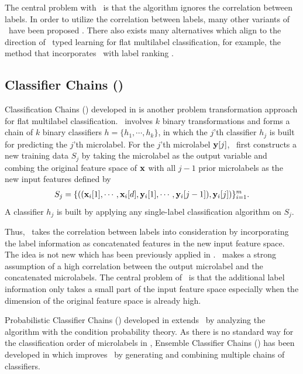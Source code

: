 {The central problem with \mlknn\ is that the algorithm ignores the correlation between labels.
In order to utilize the correlation between labels, many other variants of \mlknn\ have been proposed \citep{Cheng09combining,Younes11a}.
There also exists many alternatives which align to the direction of \knn\ typed learning for flat multilabel classification, for example, the method that incorporates \knn\ with label ranking \citep{Brinker07case,Chiang12a}.



%
%
\subsection{Classifier Chains (\cc)}

Classification Chains (\cc) developed in \citep{Read09classifier,Read11classifier} is another problem transformation approach for flat multilabel classification.
\cc\ involves $k$ binary transformations and forms a chain of $k$ binary classifiers $h=\{h_1,\cdots,h_k\}$, in which the $j$'th classifier $h_j$ is built for predicting the $j$'th microlabel.
For the $j$'th microlabel $\mathbf {y}[j]$, \cc\ first constructs a new training data $S_j$ by taking the microlabel as the output variable and combing the original feature space of $\mathbf {x}$ with all $j-1$ prior microlabels as the new input features defined by
\begin{align*}
	S_j = \{((\mathbf {x}_i[1],\cdots,\mathbf {x}_i[d],\mathbf {y}_i[1],\cdots,\mathbf {y}_i[j-1]),\mathbf {y}_i[j])\}_{i=1}^{m}.
\end{align*}
A classifier $h_j$ is built by applying any single-label classification algorithm on $S_j$.

Thus, \cc\ takes the correlation between labels into consideration by incorporating the label information as concatenated features in the new input feature space.
The idea is not new which has been previously applied in \citep{Godbole04discriminative}.
\cc\ makes a strong assumption of a high correlation between the output microlabel and the concatenated microlabels.
The central problem of \cc\ is that the additional label information only takes a small part of the input feature space especially when the dimension of the original feature space is already high.

Probabilistic Classifier Chains (\pcc) developed in \citep{Read09classifier,Dembczynski10bayes} extends \cc\ by analyzing the algorithm with the condition probability theory.
As there is no standard way for the classification order of microlabels in \cc, Ensemble Classifier Chains (\ecc) has been developed in \citep{Read11classifier} which improves \cc\ by generating and combining multiple chains of classifiers. 



}

